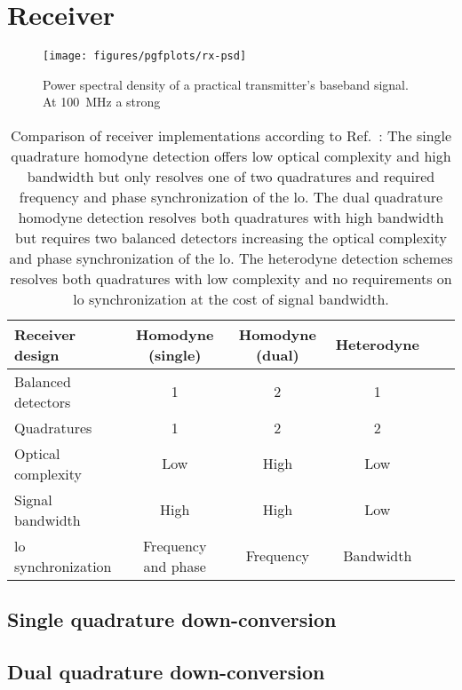\section{Receiver}


\begin{figure}[htb]
	\centering
	\texttt{[image: figures/pgfplots/rx-psd]}
	\caption{Power spectral density of a practical transmitter's baseband signal. At \SI{100}{\mega\hertz} a strong }\label{fig:transmit_spectrum}
\end{figure}


\begin{table}[htb]
  \centering
  \begin{tabular}{lccccc}
    \toprule
    Receiver design & Homodyne (single) & Homodyne (dual) & Heterodyne \\
    \midrule
    Balanced detectors & \num{1} & \num{2} & \num{1} \\
    Quadratures & \num{1} & \num{2} & \num{2} \\
    Optical complexity & Low & High & Low \\
    Signal bandwidth & High & High & Low \\
    \gls{lo} synchronization & Frequency and phase & Frequency & Bandwidth \\
    \bottomrule
  \end{tabular}
  \caption{Comparison of receiver implementations according to Ref.~\cite{Brunner2017}: The single quadrature homodyne detection offers low optical complexity and high bandwidth but only resolves one of two quadratures and required frequency and phase synchronization of the \gls{lo}. The dual quadrature homodyne detection resolves both quadratures with high bandwidth but requires two balanced detectors increasing the optical complexity and phase synchronization of the \gls{lo}. The heterodyne detection schemes resolves both quadratures with low complexity and no requirements on \gls{lo} synchronization at the cost of signal bandwidth.}\label{tab:receivers}
\end{table}

\subsection{Single quadrature down-conversion}

\subsection{Dual quadrature down-conversion}

